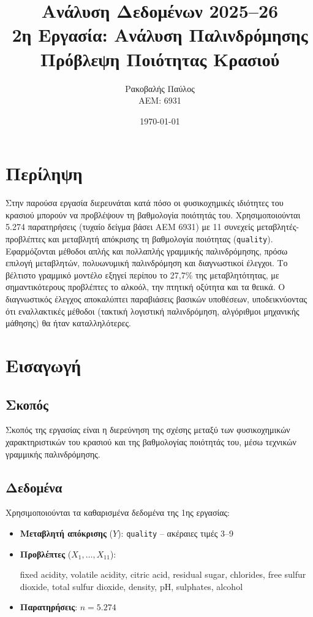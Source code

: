 \documentclass[12pt,a4paper]{article}
\title{
    \textbf{Ανάλυση Δεδομένων 2025--26}\\[0.3cm]
    \Large 2η Εργασία: Ανάλυση Παλινδρόμησης\\[0.2cm]
    \large Πρόβλεψη Ποιότητας Κρασιού
}
\author{
    Ρακοβαλής Παύλος\\
    ΑΕΜ: 6931
}
\date{\today}
\begin{document}
\maketitle
\thispagestyle{fancy}

\section*{Περίληψη}

Στην παρούσα εργασία διερευνάται κατά πόσο οι φυσικοχημικές ιδιότητες του κρασιού μπορούν να προβλέψουν τη βαθμολογία ποιότητάς του. Χρησιμοποιούνται 5.274 παρατηρήσεις (τυχαίο δείγμα βάσει ΑΕΜ 6931) με 11 συνεχείς μεταβλητές-προβλέπτες και μεταβλητή απόκρισης τη βαθμολογία ποιότητας (\texttt{quality}). Εφαρμόζονται μέθοδοι απλής και πολλαπλής γραμμικής παλινδρόμησης, πρόσω επιλογή μεταβλητών, πολυωνυμική παλινδρόμηση και διαγνωστικοί έλεγχοι. Το βέλτιστο γραμμικό μοντέλο εξηγεί περίπου το 27,7\% της μεταβλητότητας, με σημαντικότερους προβλέπτες το αλκοόλ, την πτητική οξύτητα και τα θειικά. Ο διαγνωστικός έλεγχος αποκαλύπτει παραβιάσεις βασικών υποθέσεων, υποδεικνύοντας ότι εναλλακτικές μέθοδοι (τακτική λογιστική παλινδρόμηση, αλγόριθμοι μηχανικής μάθησης) θα ήταν καταλληλότερες.

\tableofcontents
\newpage

\section{Εισαγωγή}

\subsection{Σκοπός}

Σκοπός της εργασίας είναι η διερεύνηση της σχέσης μεταξύ των φυσικοχημικών χαρακτηριστικών του κρασιού και της βαθμολογίας ποιότητάς του, μέσω τεχνικών γραμμικής παλινδρόμησης.

\subsection{Δεδομένα}

Χρησιμοποιούνται τα καθαρισμένα δεδομένα της 1ης εργασίας:
\begin{itemize}[nosep]
    \item \textbf{Μεταβλητή απόκρισης} ($Y$): \texttt{quality} -- ακέραιες τιμές 3--9
    \item \textbf{Προβλέπτες} ($X_1, \ldots, X_{11}$): \begin{english}fixed acidity, volatile acidity, citric acid, residual sugar, chlorides, free sulfur dioxide, total sulfur dioxide, density, pH, sulphates, alcohol\end{english}
    \item \textbf{Παρατηρήσεις}: $n = 5.274$
\end{itemize}
\end{document}
